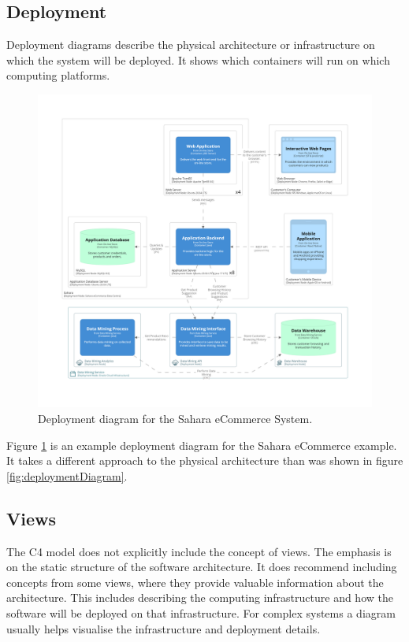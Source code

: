\subsection{Deployment}
Deployment diagrams describe the physical architecture or infrastructure on which the system will be deployed.
It shows which containers will run on which computing platforms.

\begin{figure}[h!]
    \centering
    \begin{adjustwidth}{-6mm}{-6mm}
        \includegraphics[trim=195 225 195 195,clip,width=0.93\paperwidth]{images/c4/deployment_diagram.png}
    \end{adjustwidth}
    \caption{Deployment diagram for the Sahara eCommerce System.}
    \label{fig:c4_deployment}
\end{figure}

\noindent
Figure \ref{fig:c4_deployment} is an example deployment diagram for the Sahara eCommerce example.
It takes a different approach to the physical architecture than was shown in figure \ref{fig:deploymentDiagram}.

\subsection{Views}
The C4 model does not explicitly include the concept of views.
The emphasis is on the static structure of the software architecture.
It does recommend including concepts from some views, where they provide valuable information about the architecture.
This includes describing the computing infrastructure and how the software will be deployed on that infrastructure.
For complex systems a diagram usually helps visualise the infrastructure and deployment details.

